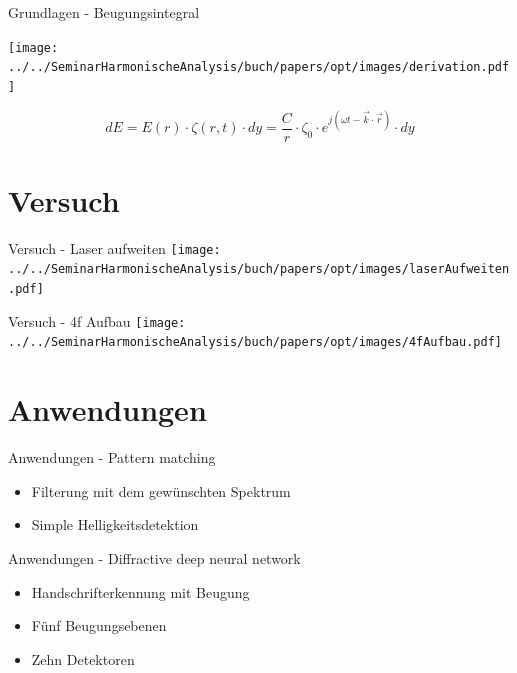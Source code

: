 \documentclass{beamer}
\begin{document}
\begin{frame}{Grundlagen - Beugungsintegral}
    \begin{center}
        \texttt{[image: ../../SeminarHarmonischeAnalysis/buch/papers/opt/images/derivation.pdf]}
    \end{center}
    \begin{equation}
        dE
        =
        E(r) \cdot \zeta(r, t) \cdot dy
        =
        \frac{C}{r} \cdot \zeta_0 \cdot e^{j(\omega t - \vec{k}\cdot\vec{r})} \cdot dy
    \end{equation}
\end{frame}

\section{Versuch}

\begin{frame}{Versuch - Laser aufweiten}
    \centering
    \texttt{[image: ../../SeminarHarmonischeAnalysis/buch/papers/opt/images/laserAufweiten.pdf]}
\end{frame}

\begin{frame}{Versuch - 4f Aufbau}
    \texttt{[image: ../../SeminarHarmonischeAnalysis/buch/papers/opt/images/4fAufbau.pdf]}
\end{frame}

\section{Anwendungen}

\begin{frame}{Anwendungen - Pattern matching}
    \begin{itemize}
        \item Filterung mit dem gewünschten Spektrum
        \item Simple Helligkeitsdetektion
    \end{itemize}
\end{frame}

\begin{frame}{Anwendungen - Diffractive deep neural network}
    \begin{itemize}
        \item Handschrifterkennung mit Beugung
        \item Fünf Beugungsebenen
        \item Zehn Detektoren
    \end{itemize}
\end{frame}
\end{document}
